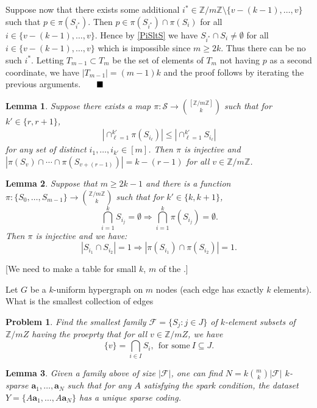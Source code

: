\documentclass[journal, onecolumn]{IEEEtran}
\newtheorem{lemma}{Lemma}
\newtheorem{problem}{Problem}
\begin{document}
Suppose now that there exists some additional $i^* \in \mathbb{Z}/m\mathbb{Z} \setminus \{v-(k-1), \ldots, v\}$ such that $p \in \pi(S_{i^*})$. Then $p \in \pi(S_{i^*}) \cap \pi(S_i)$ for all $i \in \{v-(k-1), \ldots, v\}$. Hence by \eqref{PiSltS} we have $S_{i^*} \cap S_i \neq \emptyset$ for all $i \in \{v-(k-1), \ldots, v\}$ which is impossible since $m \geq 2k$. Thus there can be no such $i^*$. Letting $T_{m-1} \subset T_m$ be the set of elements of $T_m$ not having $p$ as a second coordinate, we have $|T_{m-1}| = (m-1)k$ and the proof follows by iterating the previous arguments. $\indent \blacksquare$

\begin{lemma}\label{NonEmptyLemma}Suppose there exists a map $\pi: \mathcal{S} \to {[\mathbb{Z}/m\mathbb{Z}] \choose k}$ such that for $k' \in \{r, r+1\}$,
\begin{align}\label{PiSltS}
|\cap_{\ell = 1}^{k'}\pi(S_{i_\ell})| \leq |\cap_{\ell=1}^{k'} S_{i_\ell} |
\end{align}
%
for any set of distinct $i_1, \ldots, i_{k'} \in [m]$. Then $\pi$ is injective and $|\pi(S_v) \cap \cdots \cap \pi(S_{v+(r-1)})| = k-(r-1)$ for all $v \in \mathbb{Z}/m\mathbb{Z}$.
\end{lemma}


\begin{lemma}
Suppose that $m \geq 2k-1$ and there is a function $\pi: \{S_0, \ldots, S_{m-1}\} \to {\mathbb Z/m\mathbb Z \choose k}$ such that for $k' \in \{k, k+1\}$,
\[ \bigcap_{i=1}^{k} S_{i_j} = \emptyset \Longrightarrow \bigcap_{i=1}^{k} \pi(S_{i_j}) = \emptyset.\]
Then $\pi$ is injective and we have:
\[ |S_{i_1} \cap S_{i_2}| = 1  \Longrightarrow |\pi(S_{i_1}) \cap \pi(S_{i_2})| = 1.\]
\end{lemma}


[We need to make a table for small $k$, $m$ of the .]

Let $G$ be a $k$-uniform hypergraph on $m$ nodes (each edge has exactly $k$ elements).
What is the smallest collection of edges 

\begin{problem}
Find the smallest family $\mathcal{F} = \{S_j: j \in J\}$ of $k$-element subsets of $\mathbb Z/mZ$ having the proeprty that for all $v \in \mathbb Z/mZ$, we have
\[\{v\} = \bigcap_{i \in I} S_i, \ \ \text{for some} \ I \subseteq J.\]
\end{problem}


\begin{lemma}
Given a family above of size $|\mathcal{F}|$, one can find $N = k{m \choose k}|\mathcal{F}|$ $k$-sparse $\mathbf{a}_1, \ldots, \mathbf{a}_N$ such that for any $A$ satisfying the spark condition, the dataset $Y = \{A\mathbf{a}_1,\ldots, A\mathbf{a}_N\}$ has a unique sparse coding.
\end{lemma}
\end{document}
